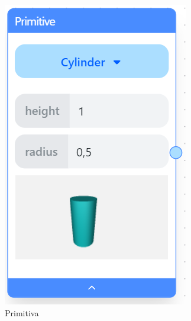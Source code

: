\begin{figure}[!h]
    \centering
    \begin{subfigure}[b]{0.2\textwidth}
        \centering
        \includegraphics[width=\textwidth]{Plantilla-TFG-master/img/nodo_primitiva.png}
        \caption{Primitiva}
    \end{subfigure}
    \hspace{10pt}
    \begin{subfigure}[b]{0.21\textwidth}
        \centering

\end{subfigure}
\end{figure}
